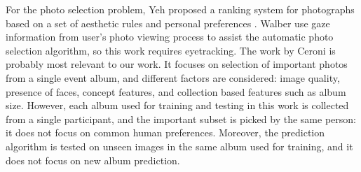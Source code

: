 \documentclass[10pt,twocolumn,letterpaper]{article}
\begin{document}
For the photo selection problem, 
Yeh \etal proposed a ranking system for photographs based on a set of aesthetic rules and personal preferences \cite{perosnalized_che}. 
Walber \etal use gaze information from user's photo viewing process to assist the automatic photo selection algorithm, so this work requires eyetracking\cite{gaze}. The work by Ceroni \etal \cite{photo_selection1} is probably most relevant to our work. It focuses on selection of important photos from a single event album, and different factors are considered: image quality, presence of faces, concept features, and collection based features such as album size. However, each album used for training and testing in this work is collected from a single participant, and the important subset is picked by the same person: it does not focus on common human preferences. 
Moreover, the prediction algorithm is tested on unseen images in the same album used for training, and it does not focus on new album prediction.



\end{document}
